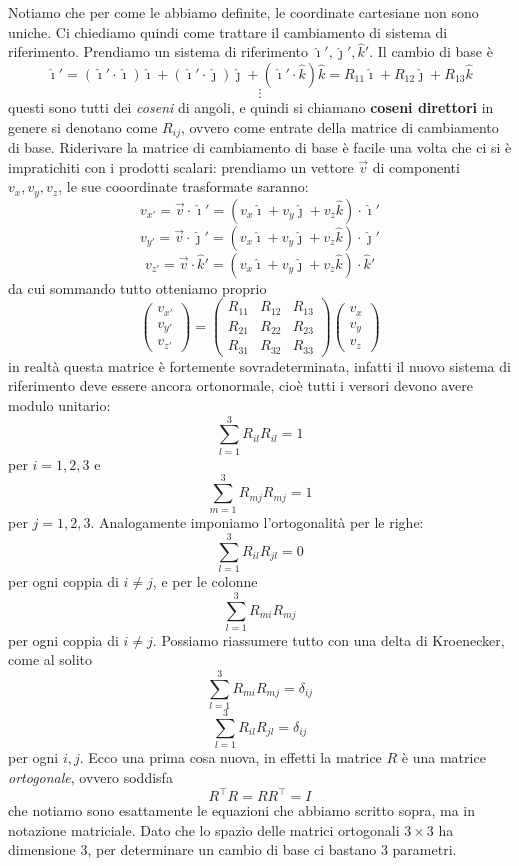 \documentclass[11pt]{scrartcl}
\newcommand{\ihat}{\hat{\imath}}
\newcommand{\jhat}{\hat{\jmath}}
\newcommand{\khat}{\hat{k}}
\begin{document}
	Notiamo che per come le abbiamo definite, le coordinate cartesiane non sono uniche. Ci chiediamo quindi come trattare il cambiamento di sistema di riferimento. Prendiamo un sistema di riferimento $\ihat',\jhat',\khat'$. Il cambio di base è
	$$\ihat'= (\ihat'\cdot \ihat)\ihat + (\ihat'\cdot \jhat)\jhat+(\ihat'\cdot \khat)\khat=R_{11}\ihat + R_{12}\jhat + R_{13}\khat$$
	$$\vdots$$
	questi sono tutti dei \textit{coseni} di angoli, e quindi si chiamano \textbf{coseni direttori} in genere si denotano come $R_{ij}$, ovvero come entrate della matrice di cambiamento di base. Riderivare la matrice di cambiamento di base è facile una volta che ci si è impratichiti con i prodotti scalari: prendiamo un vettore $\vec{v}$ di componenti $v_x,v_y,v_z$, le sue cooordinate trasformate saranno: 
	$$v_{x'}=\vec{v}\cdot \ihat'=\left(v_x\ihat+v_y\jhat+v_z\khat\right)\cdot \ihat'$$
	$$v_{y'}=\vec{v}\cdot \jhat'=\left(v_x\ihat+v_y\jhat+v_z\khat\right)\cdot \jhat'$$
	$$v_{z'}=\vec{v}\cdot \khat'=\left(v_x\ihat+v_y\jhat+v_z\khat\right)\cdot \khat'$$
	da cui sommando tutto otteniamo proprio
	$$\begin{pmatrix}
		v_{x'}\\
		v_{y'}\\
		v_{z'}
	\end{pmatrix}
	=
	\begin{pmatrix}
		R_{11} & R_{12} & R_{13} \\
		R_{21} & R_{22} & R_{23} \\
		R_{31} & R_{32} & R_{33}
	\end{pmatrix}
	\begin{pmatrix}
		v_x \\
		v_y \\
		v_z
	\end{pmatrix}
	$$
	in realtà questa matrice è fortemente sovradeterminata, infatti il nuovo sistema di riferimento deve essere ancora ortonormale, cioè tutti i versori devono avere modulo unitario:
	$$\sum_{l=1}^3R_{il}R_{il}=1$$
	per $i=1,2,3$ e 
	$$\sum_{m=1}^3R_{mj}R_{mj}=1$$
	per $j=1,2,3$. Analogamente imponiamo l'ortogonalità per le righe:
	$$\sum_{l=1}^3R_{il}R_{jl}=0$$
	per ogni coppia di $i\ne j$, e per le colonne
	$$\sum_{l=1}^3R_{mi}R_{mj}$$
	per ogni coppia di $i\ne j$. Possiamo riassumere tutto con una delta di Kroenecker, come al solito
	$$\sum_{l=1}^3R_{mi}R_{mj}=\delta_{ij}$$
	$$\sum_{l=1}^3R_{il}R_{jl}=\delta_{ij}$$
	per ogni $i,j$. Ecco una prima cosa nuova, in effetti la matrice $R$ è una matrice \textit{ortogonale}, ovvero soddisfa
	$$R^\intercal R=RR^\intercal=I$$
	che notiamo sono esattamente le equazioni che abbiamo scritto sopra, ma in notazione matriciale. Dato che lo spazio delle matrici ortogonali $3\times 3$ ha dimensione $3$, per determinare un cambio di base ci bastano $3$ parametri. \\
\end{document}

